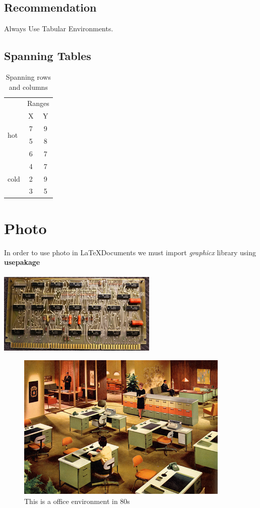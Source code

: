 \documentclass{article}
\begin{document}
			\subsection{Recommendation}
				Always Use Tabular Environments.
			\subsection{Spanning Tables}
				\begin{table}[htp]
					\caption{Spanning rows and columns}
					\begin{center}
						\begin{tabular}{|l|c|c|}
							\hline
							&\multicolumn{2}{c|}{Ranges}\\
							&X&Y\\
							\hline
							\multirow{2}{*}{hot}&7&9\\%
							&5&8\\
							&6&7\\
							\hline
							\multirow{3}{*}{cold}&4&7\\
							&2&9\\&3&5\\
							\hline
						\end{tabular}
					\end{center}
					\label{tab:multi}
				\end{table}
	\section{Photo}
		In order to use photo in \LaTeX Documents we must import \emph{graphicx} library using \textbf{usepakage}\\ \\
		\includegraphics[width=3in]{f1160-board4-l.jpg}
		\begin{figure}[htbp]
			\begin{center}
				\includegraphics[width=4in]{desks.png}
				\caption{This is a office environment in 80s}
				\label{fig:Office}
			\end{center}
		\end{figure}
\end{document}
